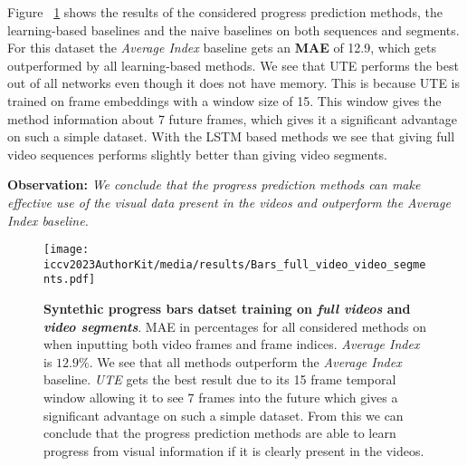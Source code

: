 Figure ~\ref{fig:result_bars} shows the results of the considered progress prediction methods, the learning-based baselines and the naive baselines on both sequences and segments. For this dataset the \textsl{Average Index} baseline gets an \textbf{MAE} of 12.9, which gets outperformed by all learning-based methods. We see that UTE performs the best out of all networks even though it does not have memory. This is because UTE is trained on frame embeddings with a window size of 15. This window gives the method information about 7 future frames, which gives it a significant advantage on such a simple dataset. With the LSTM based methods we see that giving full video sequences performs slightly better than giving video segments.

\smallskip\noindent\textbf{Observation:} \emph{We conclude that the progress prediction methods can make effective use of the visual data present in the videos and outperform the \textsl{Average Index} baseline.
}
\begin{figure}
\begin{center}
   \texttt{[image: iccv2023AuthorKit/media/results/Bars\_full\_video\_video\_segments.pdf]}
\end{center}
   \caption{\textbf{Syntethic progress bars datset training on \textsl{full videos} and \textsl{video segments}}. MAE in percentages for all considered methods on when inputting both video frames and frame indices. \textsl{Average Index} is $12.9\%$. We see that all methods outperform the \textsl{Average Index} baseline. \textsl{UTE} gets the best result due to its 15 frame temporal window allowing it to see 7 frames into the future which gives a significant advantage on such a simple dataset. From this we can conclude that the progress prediction methods are able to learn progress from visual information if it is clearly present in the videos.}
\label{fig:result_bars}
\end{figure}